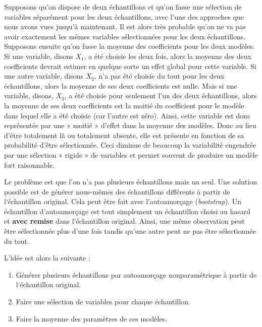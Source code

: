 \documentclass[
  11pt,
  letterpaper,
]{scrbook}
\providecommand{\tightlist}{%
  \setlength{\itemsep}{0pt}\setlength{\parskip}{0pt}}\usepackage{longtable,booktabs,array}
\theoremstyle{definition}
\theoremstyle{remark}
\begin{document}
Supposons qu'on dispose de deux échantillons et qu'on fasse une
sélection de variables séparément pour les deux échantillons, avec l'une
des approches que nous avons vues jusqu'à maintenant. Il est alors très
probable qu'on ne va pas avoir exactement les mêmes variables
sélectionnées pour les deux échantillons. Supposons ensuite qu'on fasse
la moyenne des coefficients pour les deux modèles. Si une variable,
disons \(X_1\), a été choisie les deux fois, alors la moyenne des deux
coefficients devrait estimer en quelque sorte un effet global pour cette
variable. Si une autre variable, disons \(X_2\), n'a pas été choisie du
tout pour les deux échantillons, alors la moyenne de ses deux
coefficients est nulle. Mais si une variable, disons, \(X_3\), a été
choisie pour seulement l'un des deux échantillons, alors la moyenne de
ses deux coefficients est la moitié du coefficient pour le modèle dans
lequel elle a été choisie (car l'autre est zéro). Ainsi, cette variable
est donc représentée par une « moitié » d'effet dans la moyenne des
modèles. Donc au lieu d'être totalement là ou totalement absente, elle
est présente en fonction de sa probabilité d'être sélectionnée. Ceci
diminue de beaucoup la variabilité engendrée par une sélection « rigide
» de variables et permet souvent de produire un modèle fort raisonnable.

Le problème est que l'on n'a pas plusieurs échantillons mais un seul.
Une solution possible est de générer nous-mêmes des échantillons
différents à partir de l`échantillon original. Cela peut être fait avec
l'autoamorçage (\emph{bootstrap}). Un échantillon d'autoamorçage est
tout simplement un échantillon choisi au hasard et \textbf{avec remise}
dans l'échantillon original. Ainsi, une même observation peut être
sélectionnée plus d'une fois tandis qu'une autre peut ne pas être
sélectionnée du tout.

L'idée est alors la suivante :

\begin{enumerate}
\def\labelenumi{\arabic{enumi})}
\tightlist
\item
  Générer plusieurs échantillons par autoamorçage nonparamétrique à
  partir de l`échantillon original.
\item
  Faire une sélection de variables pour chaque échantillon.
\item
  Faire la moyenne des paramètres de ces modèles.
\end{enumerate}
\end{document}
